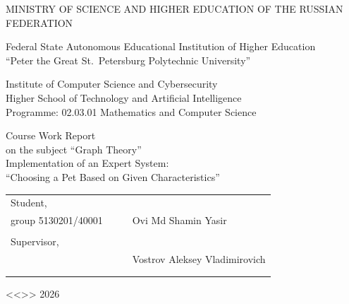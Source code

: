 \documentclass[a4paper,final]{article}
\begin{document}
	\begin{center}
		\normalsize\bf{{MINISTRY OF SCIENCE AND HIGHER EDUCATION
		OF THE RUSSIAN FEDERATION}

			\hfill \break
			Federal State Autonomous Educational Institution of Higher Education\\
			``Peter the Great St.~Petersburg Polytechnic University''\\[10pt]}
		\hfill \break
		\normalsize{Institute of Computer Science and Cybersecurity}\\[10pt]

		\normalsize{Higher School of Technology and Artificial Intelligence}\\[10pt]

		\normalsize{Programme: 02.03.01 Mathematics and Computer Science}\\
		\vspace{50pt}

		\vspace{1pt}
		\begin{center}
Course Work Report\\
on the subject ``Graph Theory''\\
Implementation of an Expert System:\\
``Choosing a Pet Based on Given Characteristics''
		\end{center}

		\hfill \break
		\hfill \break
	\end{center}
	\small{ \bf
		\begin{tabular}{lrrl}
			\!\!\!Student, & \hspace{0cm} & & \\
			\!\!\!group 5130201/40001 & \hspace{1.5cm} & \underline{\hspace{3cm}} & \hspace{-0.3cm}Ovi Md Shamin Yasir  \\\\
			\!\!\!Supervisor, & \hspace{1cm} & \\
			\!\!\! & \hspace{0.1cm} & \underline{\hspace{3cm}} & Vostrov Aleksey Vladimirovich\\\\
			&&\hspace{3.5cm}
		\end{tabular}
		\begin{flushright}
			<<\underline{\hspace{1cm}}>>\underline{\hspace{2.5cm}} 2026
		\end{flushright}
	}
\end{document}
